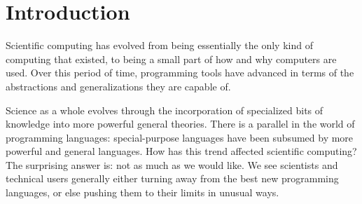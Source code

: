 \chapter{Introduction}

Scientific computing has evolved from being essentially the only kind of
computing that existed, to being a small part of how and why computers
are used.
Over this period of time, programming tools have advanced in terms of
the abstractions and generalizations they are capable of.

Science as a whole evolves through the incorporation of specialized bits
of knowledge into more powerful general theories.  
There is a parallel in the world of programming languages:
special-purpose languages have been subsumed by more powerful and general
languages.
How has this trend affected scientific computing?
The surprising answer is: not as much as we would like.
We see scientists and technical users generally either turning away
from the best new programming languages, or else pushing them
to their limits in unusual ways.



